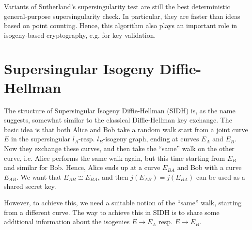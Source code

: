 Variants of Sutherland's supersingularity test are still the best deterministic general-purpose supersingularity check.
In particular, they are faster than ideas based on point counting.
Hence, this algorithm also plays an important role in isogeny-based cryptography, e.g. for key validation.

\section{Supersingular Isogeny Diffie-Hellman}
The structure of Supersingular Isogeny Diffie-Hellman (SIDH) is, as the name suggests, somewhat similar to the classical Diffie-Hellman key exchange.
The basic idea is that both Alice and Bob take a random walk start from a joint curve $E$ in the supersingular $l_A$-resp. $l_B$-isogeny graph, ending at curves $E_A$ and $E_B$.
Now they exchange these curves, and then take the ``same'' walk on the other curve, i.e. Alice performs the same walk again, but this time starting from $E_B$ and similar for Bob.
Hence, Alice ends up at a curve $E_{BA}$ and Bob with a curve $E_{AB}$.
We want that $E_{AB} \cong E_{BA}$, and then $j(E_{AB}) = j(E_{BA})$ can be used as a shared secret key.

However, to achieve this, we need a suitable notion of the ``same'' walk, starting from a different curve.
The way to achieve this in SIDH is to share some additional information about the isogenies $E \to E_A$ resp. $E \to E_B$.

